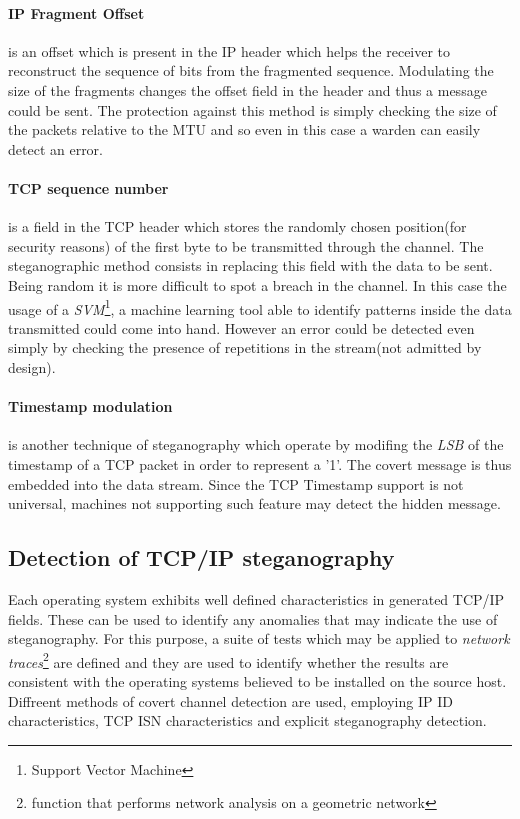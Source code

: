 \documentclass[../../main.tex]{subfiles}
\begin{document}
\paragraph{IP Fragment Offset} is an offset which is present in the IP
header which helps the receiver to reconstruct the sequence of bits from the
fragmented sequence.
Modulating the size of the fragments changes the offset field in the header
and thus a message could be sent.
The protection against this method is simply checking the size of the
packets relative to the MTU and so even in this case a warden can easily
detect an error.

\paragraph{TCP sequence number} is a field in the TCP header which stores
the randomly chosen position(for security reasons) of the first byte to be
transmitted through the channel. The steganographic method consists in
replacing this field with the data to be sent.
Being random it is more difficult to spot a breach in the channel.
In this case the usage of a \emph{SVM}\footnote{Support Vector Machine}, a
machine learning tool able to identify patterns inside the data transmitted
could come into hand.
However an error could be detected even simply by checking the presence of
repetitions in the stream(not admitted by design). 

\paragraph{Timestamp modulation} is another technique of steganography which
operate by modifing the \emph{LSB} of the
timestamp of a TCP packet in order to represent a '1'.
The covert message is thus embedded into the data stream.
Since the TCP Timestamp support is not universal, machines not supporting
such feature may detect the hidden message.


\subsection{Detection of TCP/IP steganography}

Each operating system exhibits well defined characteristics in generated
TCP/IP fields. These can be used to identify any anomalies that may indicate 
the use of steganography. For this purpose, a suite of tests which may be
applied to \emph{network traces}\footnote{function that performs network
analysis on a geometric network} are defined and they are used to identify
whether the results are consistent with the operating systems believed to be
installed on the source host.
Diffreent methods of covert channel detection are used, employing IP ID 
characteristics, TCP ISN characteristics and explicit steganography
detection.
\end{document}
